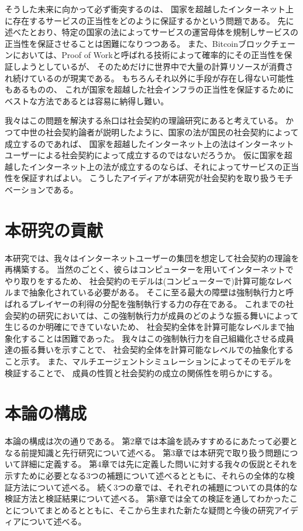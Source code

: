   そうした未来に向かって必ず衝突するのは、
  国家を超越したインターネット上に存在するサービスの正当性をどのように保証するかという問題である。
  先に述べたとおり、特定の国家の法によってサービスの運営母体を規制しサービスの正当性を保証させることは困難になりつつある。
  また、Bitcoinブロックチェーンにおいては、Proof of Workと呼ばれる技術によって確率的にその正当性を保証しようとしているが、
  そのためだけに世界中で大量の計算リソースが消費され続けているのが現実である。
  もちろんそれ以外に手段が存在し得ない可能性もあるものの、
  これが国家を超越した社会インフラの正当性を保証するためにベストな方法であるとは容易に納得し難い。

  我々はこの問題を解決する糸口は社会契約の理論研究にあると考えている。
  かつて中世の社会契約論者が説明したように、国家の法が国民の社会契約によって成立するのであれば、
  国家を超越したインターネット上の法はインターネットユーザーによる社会契約によって成立するのではないだろうか。
  仮に国家を超越したインターネット上の法が成立するのならば、それによってサービスの正当性を保証すればよい。
  こうしたアイディアが本研究が社会契約を取り扱うモチベーションである。

  \section{本研究の貢献}
  本研究では、我々はインターネットユーザーの集団を想定して社会契約の理論を再構築する。
  当然のごとく、彼らはコンピューターを用いてインターネットでやり取りをするため、
  社会契約のモデルは(コンピューターで)計算可能なレベルまで抽象化されている必要がある。
  そこに至る最大の障壁は強制執行力と呼ばれるプレイヤーの利得の分配を強制執行する力の存在である。
  これまでの社会契約の研究においては、この強制執行力が成員のどのような振る舞いによって生じるのか明確にできていないため、
  社会契約全体を計算可能なレベルまで抽象化することは困難であった。
  我々はこの強制執行力を自己組織化させる成員達の振る舞いを示すことで、
  社会契約全体を計算可能なレベルでの抽象化すること示す。
  また、マルチエージェントシミュレーションによってそのモデルを検証することで、
  成員の性質と社会契約の成立の関係性を明らかにする。

  \section{本論の構成}
  本論の構成は次の通りである。
  第2章では本論を読みすすめるにあたって必要となる前提知識と先行研究について述べる。
  第3章では本研究で取り扱う問題について詳細に定義する。
  第4章では先に定義した問いに対する我々の仮説とそれを示すために必要となる3つの補題について述べるとともに、それらの全体的な検証方法について述べる。
  続く3つの章では、それぞれの補題についての具体的な検証方法と検証結果について述べる。
  第8章では全ての検証を通してわかったことについてまとめるとともに、そこから生まれた新たな疑問と今後の研究アイディアについて述べる。

